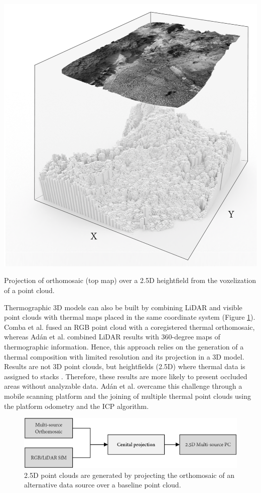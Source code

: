 \begin{marginfigure}[.15cm]
	\includegraphics{figs/context/orthomosaic_projection.png}
	\caption{Projection of orthomosaic (top map) over a 2.5D heightfield from the voxelization of a point cloud.}
	\label{fig:ortho_projection}
\end{marginfigure}
Thermographic 3D models can also be built by combining LiDAR and visible point clouds with thermal maps placed in the same coordinate system (Figure \ref{fig:fusion_data_02}). Comba et al. \cite{comba_2d_2019} fused an RGB point cloud with a coregistered thermal orthomosaic, whereas Adán et al. \cite{adan_towards_2020} combined LiDAR results with 360-degree maps of thermographic information. Hence, this approach relies on the generation of a thermal composition with limited resolution and its projection in a 3D model. Results are not 3D point clouds, but heightfields (2.5D) where thermal data is assigned to stacks \cite{juszczyk_wound_2021}. Therefore, these results are more likely to present occluded areas without analyzable data. Adán et al. \cite{adan_towards_2020} overcame this challenge through a mobile scanning platform and the joining of multiple thermal point clouds using the platform odometry and the ICP algorithm. 

\begin{figure}[!ht]
	\includegraphics[width=\linewidth]{figs/context/fusion_02.png}
	\caption{2.5D point clouds are generated by projecting the orthomosaic of an alternative data source over a baseline point cloud.}
    \label{fig:fusion_data_02}
\end{figure}

